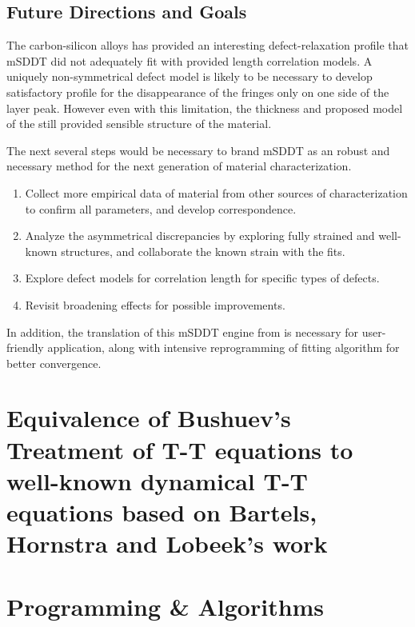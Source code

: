 \section{Future Directions and Goals}

The carbon-silicon alloys has provided an interesting defect-relaxation profile that mSDDT did not adequately fit with provided length correlation models. A uniquely non-symmetrical defect model is likely to be necessary to develop satisfactory profile for the disappearance of the fringes only on one side of the layer peak.  However even with this limitation, the thickness and proposed model of the  still provided sensible structure of the material.  

The next several steps would be necessary to brand mSDDT as an robust and necessary method for the next generation of material characterization.

{\SingleSpacing 
\begin{enumerate}
\item Collect more empirical data of material from other sources of characterization to confirm all parameters, and develop correspondence.
\item Analyze the asymmetrical discrepancies by exploring fully strained and well-known structures, and collaborate the known strain with the fits.
\item Explore defect models for correlation length for specific types of defects.
\item Revisit broadening effects for possible improvements.
\end{enumerate}}



In addition, the translation of this mSDDT engine from \MathLogo is necessary for user-friendly application, along with intensive reprogramming of fitting algorithm for better convergence.






	
\appendix

	\chapter{Equivalence of Bushuev's Treatment of T-T equations to well-known dynamical T-T equations based on Bartels, Hornstra and Lobeek's work}\label{Compare2}

\chapter{Programming \& Algorithms}

